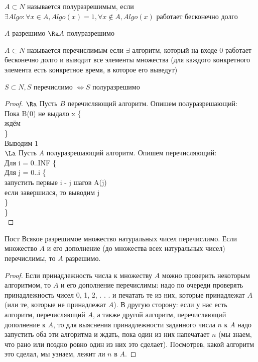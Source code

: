 \begin{Def}
	$A \subset N$ называется полуразрешимым, если
	$\exists Algo \colon \forall x \in A, Algo(x) = 1, \forall x \notin A, Algo(x)$ работает бесконечно долго
\end{Def}

\begin{Rem}
	$A$ разрешимо $\Ra A$ полуразрешимо 
\end{Rem}
\begin{Def}
	$A \subset N$ называется перечислимым если $\exists$ алгоритм, который на входе $0$ работает бесконечно долго и выводит все элементы множества (для каждого конкретного элемента есть конкретное время, в которое его выведут)
\end{Def}

\begin{theorem}
	$S \subset N, S$ перечислимо $\Leftrightarrow S$ полуразрешимо 
\end{theorem}
\begin{proof}
	$\Ra$ Пусть $B$ перечисляющий алгоритм. Опишем полуразрешающий:\\
	Пока B(0) не выдало x \{\\
		ждём\\
	\}\\
	Выводим 1\\
	$\La$ Пусть $A$ полуразрешающий алгоритм. Опишем перечисляющий:\\
	Для i = 0..INF \{\\
		Для j = 0..i \{\\
			запустить первые i - j шагов A(j)\\
			если завершился, то выводим j\\
		\}\\
	\}\\
\end{proof}
\begin{theorem}{Пост}
	Всякое разрешимое множество натуральных чисел перечислимо. Если множество $A$ и его дополнение (до множества всех натуральных чисел) перечислимы, то $A$ разрешимо.
\end{theorem}
\begin{proof}
	Если принадлежность числа к множеству $A$ можно проверить некоторым алгоритмом, то $A$ и его дополнение перечислимы: надо по очереди проверять принадлежность чисел 0, 1, 2, . . . и печатать те из них, которые принадлежат $A$ (или те, которые не принадлежат $A$).
В другую сторону: если у нас есть алгоритм, перечисляющий $A$, а также другой алгоритм, перечисляющий дополнение к $A$, то для выяснения принадлежности заданного числа $n$ к $A$ надо запустить оба эти алгоритма и ждать, пока один из них напечатает $n$ (мы знаем, что рано или поздно ровно один из них это сделает). Посмотрев, какой алгоритм это сделал, мы узнаем, лежит ли $n$ в $A$. 
\end{proof}

